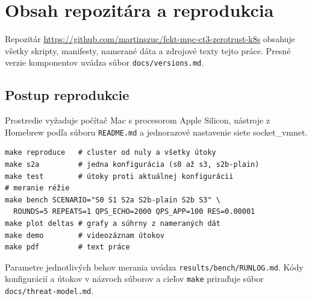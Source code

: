 \chapter{Obsah repozitára a reprodukcia}
\label{app:repo}

Repozitár \url{https://github.com/martinszuc/fekt-mpc-ct3-zerotrust-k8s} obsahuje všetky skripty, manifesty, namerané dáta a zdrojové texty tejto práce. Presné verzie komponentov uvádza súbor \texttt{docs/versions.md}.

\bigskip
{}

\section*{Postup reprodukcie}

Prostredie vyžaduje počítač Mac s procesorom Apple Silicon, nástroje z Homebrew podľa súboru \texttt{README.md} a jednorazové nastavenie siete socket\_vmnet.

\begin{lstlisting}[language={},basicstyle=\ttfamily\footnotesize]
make reproduce   # cluster od nuly a všetky útoky
make s2a         # jedna konfigurácia (s0 až s3, s2b-plain)
make test        # útoky proti aktuálnej konfigurácii
# meranie réžie
make bench SCENARIO="S0 S1 S2a S2b-plain S2b S3" \
  ROUNDS=5 REPEATS=1 QPS_ECHO=2000 QPS_APP=100 RES=0.00001
make plot deltas # grafy a súhrny z nameraných dát
make demo        # videozáznam útokov
make pdf         # text práce
\end{lstlisting}

Parametre jednotlivých behov merania uvádza \texttt{results/bench/RUNLOG.md}. Kódy konfigurácií a útokov v názvoch súborov a cieľov \texttt{make} priraďuje súbor \texttt{docs/threat-model.md}.
